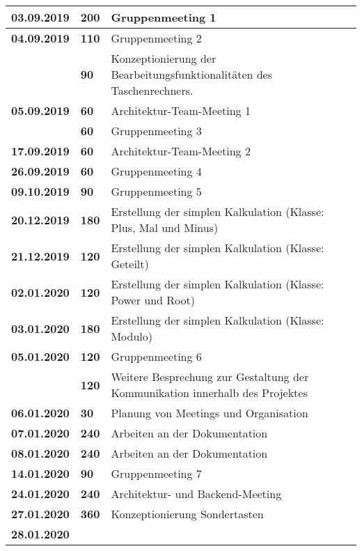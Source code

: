 {{\begin{longtable}{|l|l|p{11cm}|}
		\textbf{03.09.2019} 
		& \textbf{\hfill 200} & Gruppenmeeting 1
		\\ \hline \textbf{04.09.2019}
		& \textbf{\hfill 110} & Gruppenmeeting 2 \\\cline{2-3}
		& \textbf{\hfill 90} & Konzeptionierung der Bearbeitungsfunktionalitäten des Taschenrechners.
		\\ \hline \textbf{05.09.2019}
		& \textbf{\hfill 60} & Architektur-Team-Meeting 1 \\\cline{2-3}
		& \textbf{\hfill 60} & Gruppenmeeting 3
		\\ \hline \textbf{17.09.2019}
		& \textbf{\hfill 60} & Architektur-Team-Meeting 2
		\\ \hline \textbf{26.09.2019}
		& \textbf{\hfill 60} & Gruppenmeeting 4
		\\ \hline \textbf{09.10.2019}
		& \textbf{\hfill 90} & Gruppenmeeting 5
		\\ \hline \textbf{20.12.2019}
		& \textbf{\hfill 180} & Erstellung der simplen Kalkulation (Klasse: Plus, Mal und Minus)
		\\ \hline \textbf{21.12.2019}
		& \textbf{\hfill 120} & Erstellung der simplen Kalkulation (Klasse: Geteilt)
		\\ \hline \textbf{02.01.2020}
		& \textbf{\hfill 120} & Erstellung der simplen Kalkulation (Klasse: Power und Root)
		\\ \hline \textbf{03.01.2020}
		& \textbf{\hfill 180} & Erstellung der simplen Kalkulation (Klasse: Modulo)
		\\ \hline \textbf{05.01.2020}
		& \textbf{\hfill 120} & Gruppenmeeting 6  \\\cline{2-3}
		& \textbf{\hfill 120} & Weitere Besprechung zur Gestaltung der Kommunikation innerhalb des Projektes
		\\ \hline \textbf{06.01.2020}
		& \textbf{\hfill 30} & Planung von Meetings und Organisation
		\\ \hline \textbf{07.01.2020}
		& \textbf{\hfill 240} & Arbeiten an der Dokumentation
		\\ \hline \textbf{08.01.2020}
		& \textbf{\hfill 240} & Arbeiten an der Dokumentation
		\\ \hline \textbf{14.01.2020}
		& \textbf{\hfill 90} & Gruppenmeeting 7
		\\ \hline \textbf{24.01.2020}
		& \textbf{\hfill 240} & Architektur- und Backend-Meeting
		\\ \hline \textbf{27.01.2020}
		& \textbf{\hfill 360} & Konzeptionierung Sondertasten
		\\ \hline \textbf{28.01.2020}

\end{longtable}}}
